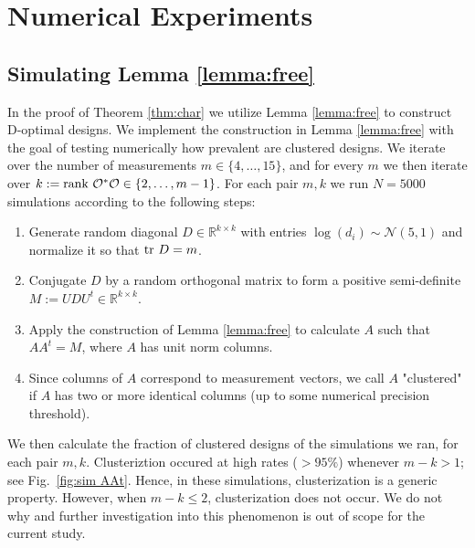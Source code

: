 \section{Numerical Experiments}


\subsection{Simulating Lemma \ref{lemma:free}}\label{subsec:lemma sims}
In the proof of Theorem \ref{thm:char} we utilize Lemma
\ref{lemma:free} to construct D-optimal designs. We implement the
construction in Lemma \ref{lemma:free} with the goal of testing
numerically how prevalent are clustered designs. We iterate over the
number of measurements $m \in \{4,\dots, 15\}$, and for every $m$ we
then iterate over $k:=\textup{rank}\  \mathcal{O}^*\mathcal{O} \in \{2,\dots, m-1\}$. For each
pair $m,k$ we run $N=5000$ simulations according to the following
steps:
\begin{enumerate}
\item Generate random diagonal $D\in \mathbb{R}^{k\times k}$ with
  entries $\log (d_i) \sim \mathcal{N}(5,1)$ and normalize it so that
  $\textup{tr}\ D = m$.
\item Conjugate $D$ by a random orthogonal matrix to form a positive
  semi-definite $M := UDU^t \in \mathbb{R}^{k\times k}$.
\item Apply the construction of Lemma \ref{lemma:free} to calculate
  $A$ such that $AA^t = M$, where $A$ has unit norm columns.
\item Since columns of $A$ correspond to measurement vectors, we call
  $A$ "clustered" if $A$ has two or more identical columns (up to some
  numerical precision threshold).
\end{enumerate}
We then calculate the fraction of clustered designs of the simulations
we ran, for each pair $m,k$. Clusteriztion occured at high rates
($>95\%$) whenever $m-k > 1$; see Fig.~\ref{fig:sim AAt}. Hence, in
these simulations, clusterization is a generic property. However, when
$m-k \leq 2$, clusterization does not occur. We do not why and further
investigation into this phenomenon is out of scope for the current
study.

